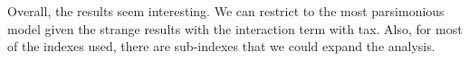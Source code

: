 \documentclass[12pt]{article}
\begin{document}
	Overall, the results seem interesting. We can restrict to the most parsimonious model given the strange results with the interaction term with tax. Also, for most of the indexes used, there are sub-indexes that we could expand the analysis.
	
	\singlespacing
	
	
	
	
	
	
	

	
	
\end{document}
